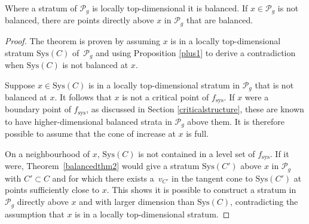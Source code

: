 \begin{Theorem}
\label{balancedthm}
Where a stratum of $\mathcal{P}_{g}$ is locally top-dimensional it is balanced. If $x\in \mathcal{P}_{g}$ is not balanced, there are points directly above $x$ in $\mathcal{P}_{g}$ that are balanced.
\end{Theorem}

\begin{proof}
The theorem is proven by assuming $x$ is in a locally top-dimensional stratum $\mathrm{Sys}(C)$ of~$\mathcal{P}_{g}$ and using Proposition \ref{plus1} to derive a contradiction when $\mathrm{Sys}(C)$ is not balanced at $x$.

Suppose $x\in \mathrm{Sys}(C)$ is in a locally top-dimensional stratum in $\mathcal{P}_{g}$ that is not balanced at $x$. It follows that $x$ is not a critical point of $f_{\mathrm{sys}}$. If $x$ were a boundary point of $f_{\mathrm{sys}}$, as discussed in Section \ref{criticalstructure}, these are known to have higher-dimensional balanced strata in $\mathcal{P}_{g}$ above them. It is therefore possible to assume that the cone of increase at $x$ is full.

On a neighbourhood of $x$, $\mathrm{Sys}(C)$ is not contained in a level set of $f_{\mathrm{sys}}$. If it were, Theorem~\ref{balancedthm2} would give a stratum $\mathrm{Sys}(C')$ above $x$ in $\mathcal{P}_{g}$ with $C'\subset C$ and for which there exists a~$v_{C'}$ in the tangent cone to $\mathrm{Sys}(C')$ at points sufficiently close to $x$. This shows it is possible to construct a stratum in $\mathcal{P}_{g}$ directly above $x$ and with larger dimension than $\mathrm{Sys}(C)$, contradicting the assumption that $x$ is in a locally top-dimensional stratum.


\end{proof}
